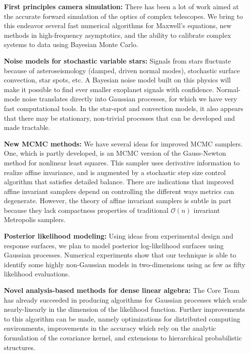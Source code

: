 \documentclass[11pt]{article}
\begin{document}
\textbf{First principles camera simulation:} 
There has been a lot of work aimed at the accurate forward simulation of the
optics of complex telescopes.
We bring to this endeavor several fast numerical algorithms for 
Maxwell's equations, new methods in 
high-frequency asymptotics, and the ability to calibrate complex systems 
to data using Bayesian Monte Carlo.

\textbf{Noise models for stochastic variable stars:}
Signals from stars fluctuate because of asteroseismology 
(damped, driven normal modes), stochastic surface convection, star
spots, etc.
A Bayesian noise model built on this physics will make it possible to 
find ever smaller exoplanet signals with confidence.
Normal-mode noise translates directly into Gaussian processes,
for which we have very fast computational tools.
In the star-spot and convection models, it also appears that there may
be stationary, non-trivial processes that can be developed and made
tractable.

\textbf{New MCMC methods:}
We have several ideas for improved MCMC samplers.
One, which is partly developed, is an MCMC version of the Gauss-Newton
method for nonlinear least squares.
This sampler uses derivative information to realize affine invariance,
and is augmented by a stochastic step size control algorithm that satisfies
detailed balance.
There are indications that improved affine invariant samplers depend on 
controlling the different ways metrics can degenerate.
However, the theory of affine invariant samplers is subtle in part
because they
lack compactness properties of traditional $\mathcal O(n)$ invariant 
Metropolis
samplers.

\textbf{Posterior likelihood modeling:}
Using ideas from experimental design and response surfaces, we plan to
model posterior log-likelihood surfaces using
Gaussian processes.
Numerical experiments show that our technique is able to
identify some highly non-Gaussian models in two-dimensions using 
as few as
fifty likelihood evaluations.

\textbf{Novel analysis-based methods for dense linear algebra:}
The Core Team has already succeeded in producing algorithms for Gaussian
processes which scale nearly-linearly in the dimension of the likelihood
function.
Further improvements to this algorithm can be made, namely optimizations
for distributed computing environments, improvements in the accuracy
which rely on the analytic formulation of the covariance kernel, and
extensions to hierarchical probabilistic structures.
\end{document}
